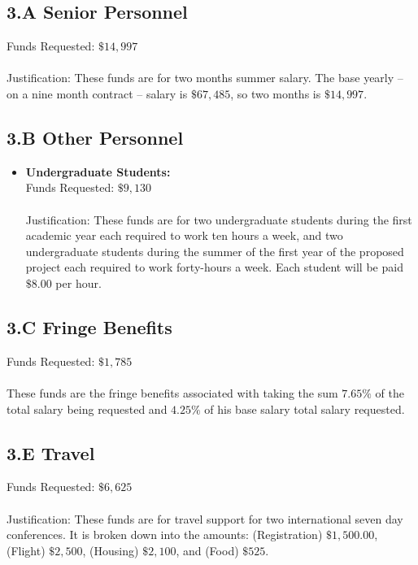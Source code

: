 \documentclass[11pt]{article}
\begin{document}
\subsection*{3.A Senior Personnel}
\label{subsec:a_senior_personnel}

Funds Requested: $\$14,997$\\ \ \\ Justification: These funds are for
two months summer salary. The base yearly -- on a nine month contract
-- salary is $\$67,485$, so two months is $\$14,997$.  

\subsection*{3.B Other Personnel}
\label{subsec:personnel}
\begin{itemize}

\item \textbf{Undergraduate Students:}\\ Funds Requested:
  $\$9,130$\\ \ \\ Justification: These funds are for two
  undergraduate students during the first academic year each required
  to work ten hours a week, and two undergraduate students during the
  summer of the first year of the proposed project each required to
  work forty-hours a week.  Each student will be paid $\$8.00$ per
  hour.
\end{itemize}

\subsection*{3.C Fringe Benefits}
\label{subsec:c_fringe_benefits}
Funds Requested: $\$1,785$\\ \ \\ These funds are the fringe benefits
associated with taking the sum $7.65\%$ of the total salary being
requested and $4.25\%$ of his base salary total salary requested.

\subsection*{3.E Travel}
\label{subsec:travel}
Funds Requested: $\$6,625$\\ \ \\ Justification: These funds are for
travel support for two international seven day conferences. It is
broken down into the amounts: (Registration) $\$1,500.00$, (Flight)
$\$2,500$, (Housing) $\$2,100$, and (Food) $\$525$.
\end{document}
